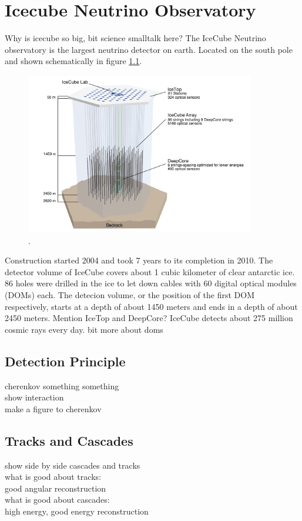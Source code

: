 \chapter{Icecube Neutrino Observatory}

Why is icecube so big, bit science smalltalk here?
The IceCube Neutrino observatory is the largest neutrino detector on earth.
Located on the south pole and shown schematically in figure \ref{fig:icecube}.

\begin{figure}
    \centering
    \includegraphics[width=10cm]{Plots/01_7_icecube/IceCube-Array.jpg}
    \caption{\cite{icecube_wesite}.}
    \label{fig:icecube}
\end{figure}

Construction started 2004 and took 7 years to its completion in 2010.
The detector volume of IceCube covers about 1 cubic kilometer of clear antarctic ice.
86 holes were drilled in the ice to let down cables with 60 digital optical modules (DOMs) each.
The detecion volume, or the position of the first DOM respectively, starts at a depth of about 1450 meters and ends in a depth of about 2450 meters.
Mention IceTop and DeepCore?
IceCube detects about 275 million cosmic rays every day.
bit more about doms


\section{Detection Principle}
cherenkov something something\\
show interaction\\
make a figure to cherenkov\\

\section{Tracks and Cascades}
show side by side cascades and tracks\\
what is good about tracks:\\
good angular reconstruction\\
what is good about cascades:\\
high energy, good energy reconstruction\\
